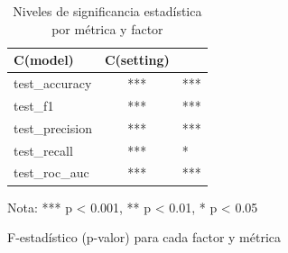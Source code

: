 \begin{table}[htbp]
\centering
\caption{Niveles de significancia estadística por métrica y factor}
\label{tab:anova_significance}
\begin{tabular}{lc}
\toprule
C(model) & C(setting) \\
\midrule
test\_accuracy & *** & *** \\
test\_f1 & *** & *** \\
test\_precision & *** & *** \\
test\_recall & *** & * \\
test\_roc\_auc & *** & *** \\
\bottomrule
\end{tabular}
\begin{tablenotes}
\small
\item Nota: *** p < 0.001, ** p < 0.01, * p < 0.05
\item F-estadístico (p-valor) para cada factor y métrica
\end{tablenotes}
\end{table}
